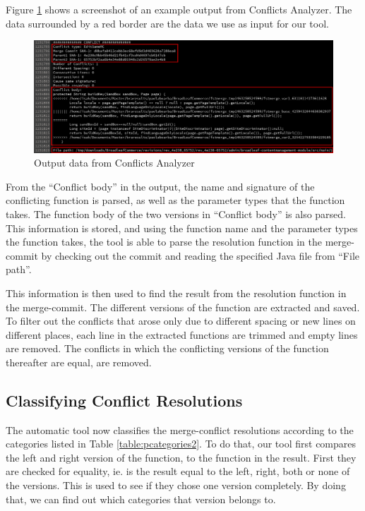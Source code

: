 {Figure \ref{fig:screenshot} shows a screenshot of an example output from Conflicts Analyzer. The data surrounded by a red border are the data we use as input for our tool.
\begin{figure}[H]
\centering
\includegraphics[width=400pt]{figure/screenshot.png}
\caption{Output data from Conflicts Analyzer}\label{fig:screenshot}
\end{figure}

From the “Conflict body” in the output, the name and signature of the conflicting function is parsed, as well as the parameter types that the function takes. The function body of the two versions in “Conflict body” is also parsed. This information is stored, and using the function name and the parameter types the function takes, the tool is able to parse the resolution function in the merge-commit by checking out the commit and reading the specified Java file from “File path”.

This information is then used to find the result from the resolution function in the merge-commit. The different versions of the function are extracted and saved. To filter out the conflicts that arose only due to different spacing or new lines on different places, each line in the extracted functions are trimmed and empty lines are removed. The conflicts in which the conflicting versions of the function thereafter are equal, are removed.

\subsection{Classifying Conflict Resolutions}
The automatic tool now classifies the merge-conflict resolutions according to the categories listed in Table \ref{table:pcategories2}. To do that, our tool first compares the left and right version of the function, to the function in the result. First they are checked for equality, ie. is the result equal to the left, right, both or none of the versions. This is used to see if they chose one version completely. By doing that, we can find out which categories that version belongs to.

}
